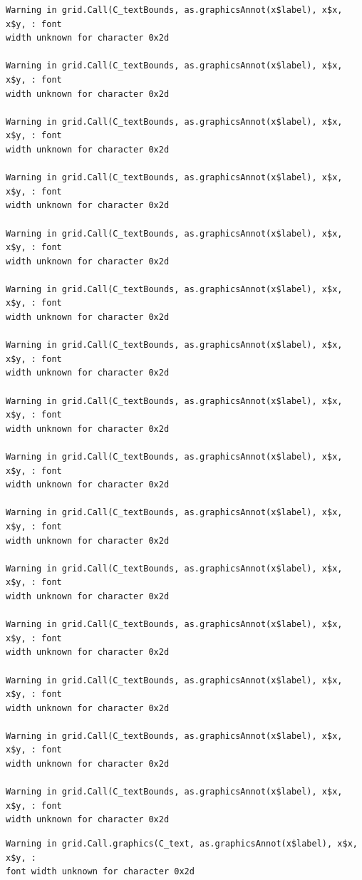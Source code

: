 \documentclass[
  letterpaper,
  DIV=11,
  numbers=noendperiod]{scrreprt}
\begin{document}
\begin{verbatim}
Warning in grid.Call(C_textBounds, as.graphicsAnnot(x$label), x$x, x$y, : font
width unknown for character 0x2d

Warning in grid.Call(C_textBounds, as.graphicsAnnot(x$label), x$x, x$y, : font
width unknown for character 0x2d

Warning in grid.Call(C_textBounds, as.graphicsAnnot(x$label), x$x, x$y, : font
width unknown for character 0x2d

Warning in grid.Call(C_textBounds, as.graphicsAnnot(x$label), x$x, x$y, : font
width unknown for character 0x2d

Warning in grid.Call(C_textBounds, as.graphicsAnnot(x$label), x$x, x$y, : font
width unknown for character 0x2d

Warning in grid.Call(C_textBounds, as.graphicsAnnot(x$label), x$x, x$y, : font
width unknown for character 0x2d

Warning in grid.Call(C_textBounds, as.graphicsAnnot(x$label), x$x, x$y, : font
width unknown for character 0x2d

Warning in grid.Call(C_textBounds, as.graphicsAnnot(x$label), x$x, x$y, : font
width unknown for character 0x2d

Warning in grid.Call(C_textBounds, as.graphicsAnnot(x$label), x$x, x$y, : font
width unknown for character 0x2d

Warning in grid.Call(C_textBounds, as.graphicsAnnot(x$label), x$x, x$y, : font
width unknown for character 0x2d

Warning in grid.Call(C_textBounds, as.graphicsAnnot(x$label), x$x, x$y, : font
width unknown for character 0x2d

Warning in grid.Call(C_textBounds, as.graphicsAnnot(x$label), x$x, x$y, : font
width unknown for character 0x2d

Warning in grid.Call(C_textBounds, as.graphicsAnnot(x$label), x$x, x$y, : font
width unknown for character 0x2d

Warning in grid.Call(C_textBounds, as.graphicsAnnot(x$label), x$x, x$y, : font
width unknown for character 0x2d

Warning in grid.Call(C_textBounds, as.graphicsAnnot(x$label), x$x, x$y, : font
width unknown for character 0x2d
\end{verbatim}

\begin{verbatim}
Warning in grid.Call.graphics(C_text, as.graphicsAnnot(x$label), x$x, x$y, :
font width unknown for character 0x2d
\end{verbatim}
\end{document}
